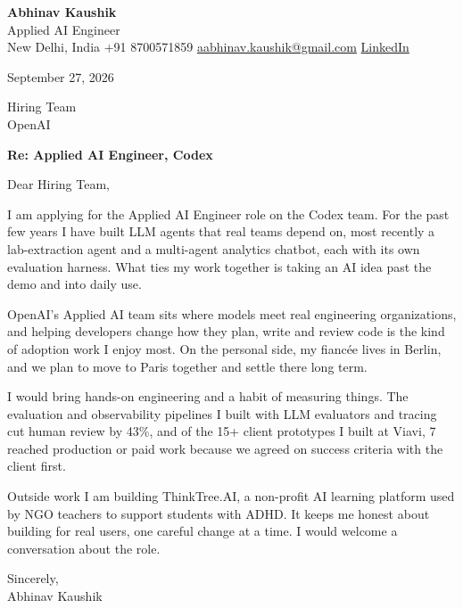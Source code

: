\documentclass[11pt,a4paper]{article}
\begin{document}
{\Large\bfseries Abhinav Kaushik}\\
Applied AI Engineer\\
New Delhi, India \textbar{} +91 8700571859 \textbar{} \href{mailto:aabhinav.kaushik@gmail.com}{aabhinav.kaushik@gmail.com} \textbar{} \href{https://www.linkedin.com/in/abhinav-kaushik10/}{LinkedIn}  

September 27, 2026

Hiring Team\\
OpenAI

\textbf{Re: Applied AI Engineer, Codex}

Dear Hiring Team,

I am applying for the Applied AI Engineer role on the Codex team. For the past few years I have built LLM agents that real teams depend on, most recently a lab-extraction agent and a multi-agent analytics chatbot, each with its own evaluation harness. What ties my work together is taking an AI idea past the demo and into daily use.

OpenAI's Applied AI team sits where models meet real engineering organizations, and helping developers change how they plan, write and review code is the kind of adoption work I enjoy most. On the personal side, my fiancée lives in Berlin, and we plan to move to Paris together and settle there long term.

I would bring hands-on engineering and a habit of measuring things. The evaluation and observability pipelines I built with LLM evaluators and tracing cut human review by 43\%, and of the 15+ client prototypes I built at Viavi, 7 reached production or paid work because we agreed on success criteria with the client first.

Outside work I am building ThinkTree.AI, a non-profit AI learning platform used by NGO teachers to support students with ADHD. It keeps me honest about building for real users, one careful change at a time. I would welcome a conversation about the role.

Sincerely,\\[4pt]
Abhinav Kaushik
\end{document}

